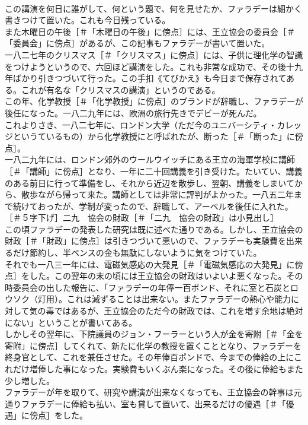 \documentclass[8pt]{extreport}
\begin{document}
\begin{CJK}{UTF8}{min}
\\	この講演を何日に誰がして、何という題で、何を見せたか、ファラデーは細かく書きつけて置いた。これも今日残っている。
\\	また木曜日の午後［＃「木曜日の午後」に傍点］には、王立協会の委員会［＃「委員会」に傍点］があるが、この記事もファラデーが書いて置いた。
\\	一八二七年のクリスマス［＃「クリスマス」に傍点］には、子供に理化学の智識をつけようというので、六回ほど講演をした。これも非常な成功で、その後十九年ばかり引きつづいて行った。この手扣《てびかえ》も今日まで保存されてある。これが有名な「クリスマスの講演」というのである。
\\	この年、化学教授［＃「化学教授」に傍点］のブランドが辞職し、ファラデーが後任になった。一八二九年には、欧洲の旅行先きでデビーが死んだ。
\\	これよりさき、一八二七年に、ロンドン大学（ただ今のユニバーシティ・カレッジというているもの）から化学教授にと呼ばれたが、断った［＃「断った」に傍点］。
\\	一八二九年には、ロンドン郊外のウールウイッチにある王立の海軍学校に講師［＃「講師」に傍点］となり、一年に二十回講義を引き受けた。たいてい、講義のある前日に行って準備をし、それから近辺を散歩し、翌朝、講義をしまいてから、散歩ながら帰って来た。講師としては非常に評判がよかった。一八五二年まで続けておったが、学制が変ったので、辞職して、アーベルを後任に入れた。
\\	［＃５字下げ］二九　協会の財政［＃「二九　協会の財政」は小見出し］
\\	この頃ファラデーの発表した研究は既に述べた通りである。しかし、王立協会の財政［＃「財政」に傍点］は引きつづいて悪いので、ファラデーも実験費を出来るだけ節約し、半ペンスの金も無駄にしないように気をつけていた。
\\	それでも一八三一年には、電磁気感応の大発見［＃「電磁気感応の大発見」に傍点］をした。この翌年の末の頃には王立協会の財政はいよいよ悪くなった。その時委員会の出した報告に、「ファラデーの年俸一百ポンド、それに室と石炭とロウソク（灯用）。これは減ずることは出来ない。またファラデーの熱心や能力に対して気の毒ではあるが、王立協会のただ今の財政では、これを増す余地は絶対にない」ということが書いてある。
\\	しかしその翌年に、下院議員のジョン・フーラーという人が金を寄附［＃「金を寄附」に傍点］してくれて、新たに化学の教授を置くこととなり、ファラデーを終身官として、これを兼任させた。その年俸百ポンドで、今までの俸給の上にこれだけ増俸した事になった。実験費もいくぶん楽になった。その後に俸給もまた少し増した。
\\	ファラデーが年を取りて、研究や講演が出来なくなっても、王立協会の幹事は元通りファラデーに俸給も払い、室も貸して置いて、出来るだけの優遇［＃「優遇」に傍点］をした。

\end{CJK}
\end{document}
